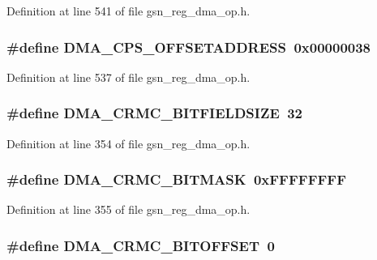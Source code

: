 Definition at line 541 of file gsn\_\-reg\_\-dma\_\-op.h.

\hypertarget{a00547_a095941c30599b8102b075d48152ae6bb}{
\subsubsection[{DMA\_\-CPS\_\-OFFSETADDRESS}]{\setlength{\rightskip}{0pt plus 5cm}\#define DMA\_\-CPS\_\-OFFSETADDRESS~0x00000038}}
\label{a00547_a095941c30599b8102b075d48152ae6bb}


Definition at line 537 of file gsn\_\-reg\_\-dma\_\-op.h.

\hypertarget{a00547_a823f60716f78a2c3a66eb5a139d6d436}{
\subsubsection[{DMA\_\-CRMC\_\-BITFIELDSIZE}]{\setlength{\rightskip}{0pt plus 5cm}\#define DMA\_\-CRMC\_\-BITFIELDSIZE~32}}
\label{a00547_a823f60716f78a2c3a66eb5a139d6d436}


Definition at line 354 of file gsn\_\-reg\_\-dma\_\-op.h.

\hypertarget{a00547_a0b33b42fa957d2ff26cc8b7b2988ccfb}{
\subsubsection[{DMA\_\-CRMC\_\-BITMASK}]{\setlength{\rightskip}{0pt plus 5cm}\#define DMA\_\-CRMC\_\-BITMASK~0xFFFFFFFF}}
\label{a00547_a0b33b42fa957d2ff26cc8b7b2988ccfb}


Definition at line 355 of file gsn\_\-reg\_\-dma\_\-op.h.

\hypertarget{a00547_a72ebeac28cdf9162668b8908367c370d}{
\subsubsection[{DMA\_\-CRMC\_\-BITOFFSET}]{\setlength{\rightskip}{0pt plus 5cm}\#define DMA\_\-CRMC\_\-BITOFFSET~0}}
\label{a00547_a72ebeac28cdf9162668b8908367c370d}


